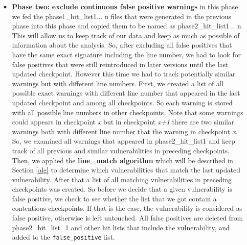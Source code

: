 \begin{itemize}
\item{\textbf{Phase two: exclude continuous false positive warnings}} in this phase we fed the phase1\_hit\_list1... n files that were generated in the previous phase into this phase and copied them to be named as  phase2\_hit\_list1... n. This will allow us to keep track of our data and keep as much as possible of information about the analysis. So, after excluding all false positives that have the same exact signature including the line number, we had to look for false positives that were still reintroduced in later versions until the last updated checkpoint. However this time we had to track potentially similar warnings but with different line numbers. First, we created a list of all possible exact warnings with different line number that appeared in the last updated checkpoint and among all checkpoints. So each warning is stored with all possible line numbers in other checkpoints. Note that some warnings could appears in checkpoint \textit{x} but in checkpoint \textit{x+1} there are two similar warnings both with different line number that the warning in checkpoint \textit{x}. So, we examined all warnings that appeared in phase2\_hit\_list1 and keep track of all previous and similar vulnerabilities in preceding checkpoints.  Then, we applied the \textbf{line\_match algorithm} which will be described in Section \ref{alg} to determine which vulnerabilities that match the last updated vulnerability. After that a list of all matching vulnerabilities in preceding checkpoints was created. So before we decide that a given vulnerability is false positive, we check to see whether the list that we got contain a contentious checkpoints. If that is the case, the vulnerability is considered as false positive, otherwise is left untouched. All false positives are deleted from phase2\_hit\_list\_1 and other hit lists that include the vulnerability, and added to the \texttt{false\_positive} list.



\end{itemize}
